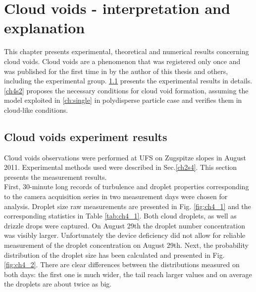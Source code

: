 \documentclass[../main.tex]{subfiles}
\begin{document}
\chapter{Cloud voids - interpretation and explanation} %

\label{ch:holes} %

This chapter presents experimental, theoretical and numerical results concerning cloud voids. Cloud voids are a phenomenon that was registered only once and was published for the first time in \citet{Karpinska2019} by the author of this thesis and others, including the experimental group. \ref{ch4s1} presents the experimental results in details. \ref{ch4s2} proposes the necessary conditions for cloud void formation, assuming the model exploited in \autoref{ch:single} in polydisperse particle case and verifies them in cloud-like conditions.

\section{Cloud voids experiment results}
\label{ch4s1}
Cloud voids observations were performed at UFS on Zugspitze slopes in August 2011. Experimental methods used were described in Sec.\autoref{ch2s4}. This section presents the measurement results.\\
First, 30-minute long records of turbulence and droplet properties corresponding to the camera acquisition series in two measurement days were chosen for analysis. Droplet size raw measurements are presented in Fig. \ref{fig:ch4_1} and the corresponding statistics in Table \ref{tab:ch4_1}. Both cloud droplets, as well as drizzle drops were captured. On August 29th the droplet number concentration was visibly larger. Unfortunately the device deficiency did not allow for reliable measurement of the droplet concentration on August 29th. Next, the probability distribution of the droplet size has been calculated and presented in Fig.\ref{fig:ch4_2}. There are clear differences between the distributions measured on both days: the first one is much wider, the tail reach larger values and on average the droplets are about twice as big.
\end{document}
